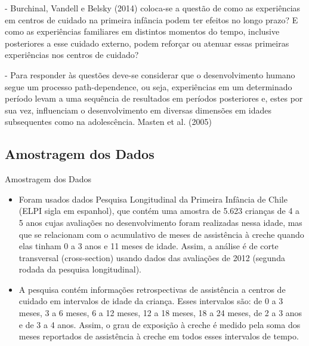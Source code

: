 \documentclass[10pt]{Beamer}
\begin{document}
\begin{frame}

\begin{tcolorbox}[drop fuzzy shadow=ShadowColor]
- Burchinal, Vandell e Belsky (2014) coloca-se a questão de como as experiências em centros de cuidado na primeira infância podem ter efeitos no longo prazo? E como as experiências familiares em distintos momentos do tempo, inclusive posteriores a esse cuidado externo, podem reforçar ou atenuar essas primeiras experiências nos centros de cuidado?

\vskip0.5cm	

- Para responder às questões deve-se considerar que o desenvolvimento humano segue um processo path-dependence, ou seja, experiências em um determinado período levam a uma sequência de resultados em períodos posteriores e, estes por sua vez, influenciam o desenvolvimento em diversas dimensões em idades subsequentes como na adolescência. Masten et al. (2005)
\end{tcolorbox}		
	
	
\end{frame}

	\subsection{Amostragem dos Dados}
	
\begin{frame}{Amostragem dos Dados}
	
\begin{block}{}
\begin{itemize}
	
\item Foram usados dados Pesquisa Longitudinal da Primeira Infância de Chile (ELPI sigla em
espanhol), que contém uma amostra de 5.623 crianças de 4 a 5 anos cujas avaliações no desenvolvimento foram realizadas nessa idade, mas que se relacionam com o acumulativo de meses de assistência à creche quando elas tinham 0 a 3 anos e 11 meses de idade. Assim, a análise é de corte transversal (cross-section) usando dados das avaliações de 2012 (segunda rodada da pesquisa longitudinal).  

\item A pesquisa contém informações retrospectivas de assistência a centros de cuidado em intervalos de idade da criança. Esses intervalos são: de 0 a 3 meses, 3 a 6 meses, 6 a 12 meses, 12 a 18 meses, 18 a 24 meses, de 2 a 3 anos e de 3 a 4 anos. Assim, o grau de exposição à creche é medido pela soma dos meses reportados de assistência à creche em todos esses intervalos de tempo.
	
\end{itemize}
\end{block}	
	
\end{frame}
\end{document}
